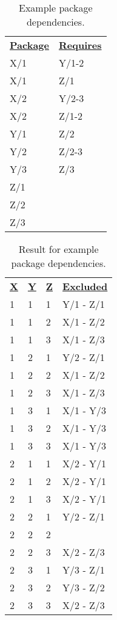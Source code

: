 \documentclass[krantzl]{krantz}
\begin{document}
\begin{table}[h]
\begin{tabular}{ll}
\textbf{\underline{Package}} & \textbf{\underline{Requires}} \\
X/1 & Y/1-2 \\
X/1 & Z/1 \\
X/2 & Y/2-3 \\
X/2 & Z/1-2 \\
Y/1 & Z/2 \\
Y/2 & Z/2-3 \\
Y/3 & Z/3 \\
Z/1 &  \\
Z/2 &  \\
Z/3 &  \\
\end{tabular}
\caption{Example package dependencies.}
\label{package-manager-example-dependencies}
\end{table}


\begin{table}[h]
\begin{tabular}{llll}
\textbf{\underline{X}} & \textbf{\underline{Y}} & \textbf{\underline{Z}} & \textbf{\underline{Excluded}} \\
1 & 1 & 1 & Y/1 - Z/1 \\
1 & 1 & 2 & X/1 - Z/2 \\
1 & 1 & 3 & X/1 - Z/3 \\
1 & 2 & 1 & Y/2 - Z/1 \\
1 & 2 & 2 & X/1 - Z/2 \\
1 & 2 & 3 & X/1 - Z/3 \\
1 & 3 & 1 & X/1 - Y/3 \\
1 & 3 & 2 & X/1 - Y/3 \\
1 & 3 & 3 & X/1 - Y/3 \\
2 & 1 & 1 & X/2 - Y/1 \\
2 & 1 & 2 & X/2 - Y/1 \\
2 & 1 & 3 & X/2 - Y/1 \\
2 & 2 & 1 & Y/2 - Z/1 \\
2 & 2 & 2 &  \\
2 & 2 & 3 & X/2 - Z/3 \\
2 & 3 & 1 & Y/3 - Z/1 \\
2 & 3 & 2 & Y/3 - Z/2 \\
2 & 3 & 3 & X/2 - Z/3 \\
\end{tabular}
\caption{Result for example package dependencies.}
\label{package-manager-example-result}
\end{table}
\end{document}
